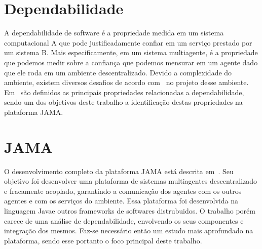 \section{Dependabilidade}

A dependabilidade de software é a propriedade medida em um sistema computacional A que pode justificadamente confiar em um serviço prestado por um sistema B. Mais especificamente,
em um sistema multiagente, é a propriedade que podemos medir sobre a confiança que podemos mensurar em um agente dado que ele roda em um ambiente descentralizado. Devido a complexidade
do ambiente, existem diversos desafios de acordo com~\cite{hoffman08} no projeto desse ambiente. Em~\cite{algirdas04} são definidos as principais propriedades relacionadas
a dependabilidade, sendo um dos objetivos deste trabalho a identificação destas propriedades na plataforma JAMA.

\section{JAMA}

O desenvolvimento completo da plataforma JAMA está descrita em~\cite{parise11}. Seu objetivo foi desenvolver uma plataforma de sistemas multiagentes descentralizado
e fracamente acoplado, garantindo a comunicação dos agentes com os outros agentes e com os serviços do ambiente. Essa plataforma foi desenvolvida na linguagem Javae outros
frameworks de softwares distrubuidos. O trabalho porém carece de uma análise de dependabilidade, envolvendo os seus componentes e integração dos mesmos. Faz-se necessário
então um estudo mais aprofundado na plataforma, sendo esse portanto o foco principal deste trabalho.





